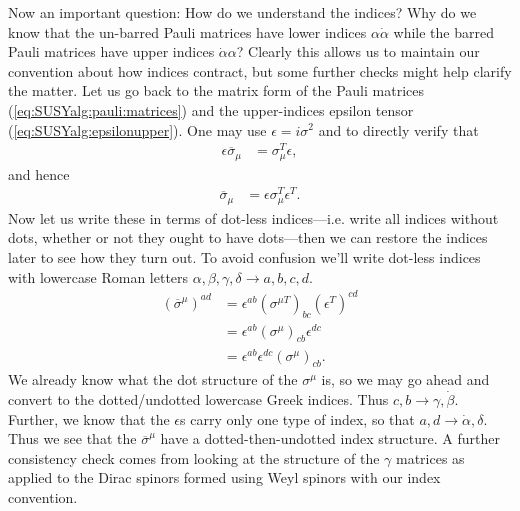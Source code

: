 \documentclass[12pt, oneside]{report}    %
\begin{document}
Now an important question: How do we understand the indices? Why do we know that the un-barred Pauli matrices have lower indices $\alpha\dot\alpha$ while the barred Pauli matrices have upper indices $\dot\alpha\alpha$? Clearly this allows us to maintain our convention about how indices contract, but some further checks might help clarify the matter. Let us go back to the matrix form of the Pauli matrices (\ref{eq:SUSYalg:pauli:matrices}) and the upper-indices epsilon tensor (\ref{eq:SUSYalg:epsilonupper}). One may use $\epsilon = i\sigma^2$ and to directly verify that 
\begin{align}
    \epsilon\overline\sigma_\mu &= \sigma_\mu^T\epsilon,
\end{align}
and hence
\begin{align}
    \overline\sigma_\mu &= \epsilon\sigma_\mu^T\epsilon^T.
\end{align}
Now let us write these in terms of dot-less indices---i.e. write all indices without dots, whether or not they ought to have dots---then we can restore the indices later to see how they turn out. To avoid confusion we'll write dot-less indices with lowercase Roman letters $\alpha,\beta,\gamma,\delta \rightarrow a,b,c,d$.
\begin{align}
    (\overline \sigma^\mu)^{ad} &= \epsilon^{ab}(\sigma^{\mu T})_{bc}(\epsilon^T)^{cd}\\
    &= \epsilon^{ab}(\sigma^\mu)_{cb} \epsilon^{dc}\\
    &= \epsilon^{ab}\epsilon^{dc}(\sigma^\mu)_{cb}.
\end{align}
We already know what the dot structure of the $\sigma^\mu$ is, so we may go ahead and convert to the dotted/undotted lowercase Greek indices. Thus $c,b \rightarrow \gamma,\dot\beta$. Further, we know that the $\epsilon$s carry only one type of index, so that $a,d \rightarrow \dot\alpha,\delta$. 
Thus we see that the $\overline\sigma^\mu$ have a dotted-then-undotted index structure. A further consistency check comes from looking at the structure of the $\gamma$ matrices as applied to the Dirac spinors formed using Weyl spinors with our index convention. %
\end{document}

